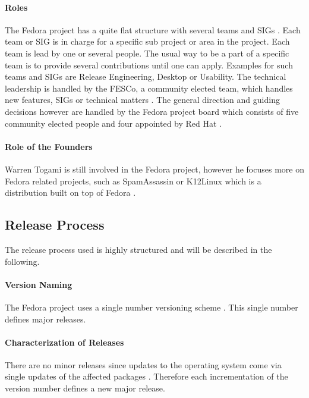 \paragraph{Roles}

The Fedora project has a quite flat structure with several teams and \acp{SIG}
\cite{FedoraJoin,FedoraCommunicating,FedoraSIG}. Each team or \ac{SIG} is in
charge for a specific sub project or area in the project. Each team is lead by
one or several people. The usual way to be a part of a specific team is to
provide several contributions until one can apply. Examples for such teams and
\acp{SIG} are Release Engineering, Desktop or Usability. The technical
leadership is handled by the \ac{FESCo}, a community elected team, which
handles new features, \acp{SIG} or technical matters \cite{FedoraFESCo}. The
general direction and guiding decisions however are handled by the Fedora
project board which consists of five community elected people and four
appointed by Red Hat \cite{FedoraBoard}.

\paragraph{Role of the Founders}

Warren Togami is still involved in the Fedora project, however he focuses more
on Fedora related projects, such as SpamAssassin or K12Linux which is a
distribution built on top of Fedora \cite{FedoraTogami}.

\subsection{Release Process}

The release process used is highly structured and will be described in the
following.

\paragraph{Version Naming}

The Fedora project uses a single number versioning scheme
\cite{FedoraHistoricalSchedules,FedoraLifeCycle}. This single number defines
major releases.

\paragraph{Characterization of Releases}

There are no minor releases since updates to the operating system come via
single updates of the affected packages
\cite{FedoraHistoricalSchedules,FedoraLifeCycle}. Therefore each incrementation
of the version number defines a new major release.

